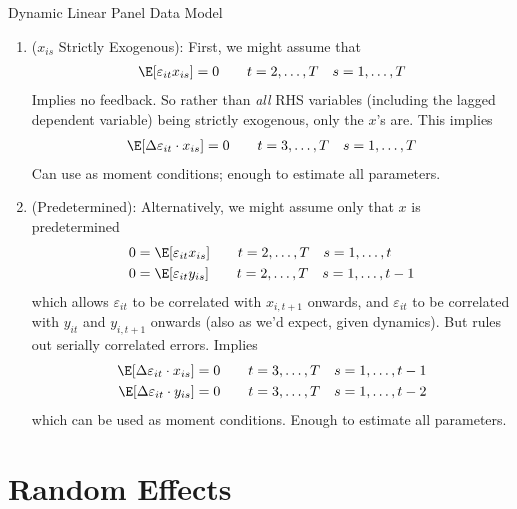 \documentclass[aspectratio=169, handout]{beamer}
\begin{document}
{\scriptsize
\begin{frame}{Dynamic Linear Panel Data Model}
\begin{enumerate}
  \item
    ($x_{is}$ Strictly Exogenous):
    First, we might assume that
    \begin{align*}
      \E[\varepsilon_{it}x_{is}] = 0
      \qquad t=2,\ldots,T
      \quad   s=1,\ldots,T
    \end{align*}
    Implies no feedback.
    So rather than \emph{all} RHS variables (including the lagged
    dependent variable) being strictly exogenous, only the $x$'s are.
    This implies
    \begin{align*}
      \E[\Delta \varepsilon_{it} \cdot x_{is}]
      = 0
      \qquad  t=3,\ldots,T
      \quad   s=1,\ldots,T
    \end{align*}
    Can use as moment conditions;
    enough to estimate all parameters.

  \item
    (Predetermined):
    Alternatively, we might assume only that $x$ is predetermined
    \begin{align*}
      0 &= \E[\varepsilon_{it} x_{is}]
      \qquad t=2,\ldots,T
      \quad  s=1,\ldots,t
      \\
      0 &= \E[\varepsilon_{it} y_{is}]
      \qquad t=2,\ldots,T
      \quad  s=1,\ldots,t-1
    \end{align*}
    which allows $\varepsilon_{it}$ to be correlated with $x_{i,t+1}$
    onwards, and $\varepsilon_{it}$ to be correlated with $y_{it}$
    and $y_{i,t+1}$ onwards (also as we'd expect, given dynamics).
    But rules out serially correlated errors.
    Implies
    \begin{align*}
      \E[\Delta \varepsilon_{it} \cdot x_{is}]
      &= 0
      \qquad  t=3,\ldots,T
      \quad   s=1,\ldots,t-1
      \\
      \E[\Delta \varepsilon_{it} \cdot y_{is}]
      &= 0
      \qquad  t=3,\ldots,T
      \quad   s=1,\ldots,t-2
    \end{align*}
    which can be used as moment conditions.
    Enough to estimate all parameters.
\end{enumerate}
\end{frame}
}




\section{Random Effects}
\end{document}
